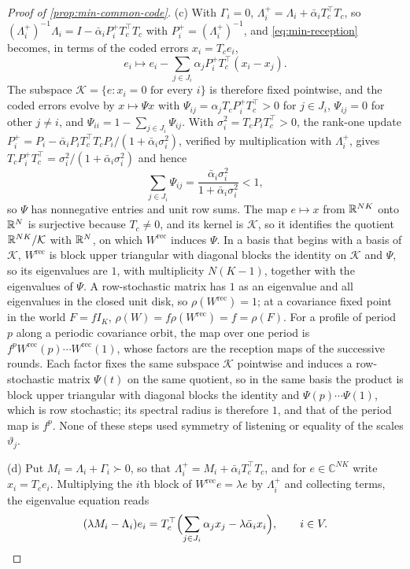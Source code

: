 \begin{proof}[Proof of \cref{prop:min-common-code}]
(c) With $\Gamma_i=0$, $\Lambda^+_i=\Lambda_i+\bar\alpha_iT_c^\top T_c$, so $(\Lambda^+_i)^{-1}\Lambda_i=I-\bar\alpha_iP^+_iT_c^\top T_c$ with $P^+_i=(\Lambda^+_i)^{-1}$, and \eqref{eq:min-reception} becomes, in terms of the coded errors $x_i=T_ce_i$,
\[
e_i\mapsto e_i-\sum_{j\in J_i}\alpha_jP^+_iT_c^\top(x_i-x_j).
\]
The subspace $\mathcal K=\{e:x_i=0\text{ for every }i\}$ is therefore fixed pointwise, and the coded errors evolve by $x\mapsto\Psi x$ with $\Psi_{ij}=\alpha_jT_cP^+_iT_c^\top>0$ for $j\in J_i$, $\Psi_{ij}=0$ for other $j\neq i$, and $\Psi_{ii}=1-\sum_{j\in J_i}\Psi_{ij}$. With $\sigma_i^2=T_cP_iT_c^\top>0$, the rank-one update $P^+_i=P_i-\bar\alpha_iP_iT_c^\top T_cP_i/(1+\bar\alpha_i\sigma_i^2)$, verified by multiplication with $\Lambda^+_i$, gives $T_cP^+_iT_c^\top=\sigma_i^2/(1+\bar\alpha_i\sigma_i^2)$ and hence
\[
\sum_{j\in J_i}\Psi_{ij}=\frac{\bar\alpha_i\sigma_i^2}{1+\bar\alpha_i\sigma_i^2}<1,
\]
so $\Psi$ has nonnegative entries and unit row sums. The map $e\mapsto x$ from $\mathbb{R}^{NK}$ onto $\mathbb{R}^N$ is surjective because $T_c\neq0$, and its kernel is $\mathcal K$, so it identifies the quotient $\mathbb{R}^{NK}/\mathcal K$ with $\mathbb{R}^N$, on which $W^{\mathrm{rec}}$ induces $\Psi$. In a basis that begins with a basis of $\mathcal K$, $W^{\mathrm{rec}}$ is block upper triangular with diagonal blocks the identity on $\mathcal K$ and $\Psi$, so its eigenvalues are $1$, with multiplicity $N(K-1)$, together with the eigenvalues of $\Psi$. A row-stochastic matrix has $1$ as an eigenvalue and all eigenvalues in the closed unit disk, so $\rho(W^{\mathrm{rec}})=1$; at a covariance fixed point in the world $F=fI_K$, $\rho(W)=f\rho(W^{\mathrm{rec}})=f=\rho(F)$. For a profile of period $p$ along a periodic covariance orbit, the map over one period is $f^pW^{\mathrm{rec}}(p)\cdots W^{\mathrm{rec}}(1)$, whose factors are the reception maps of the successive rounds. Each factor fixes the same subspace $\mathcal K$ pointwise and induces a row-stochastic matrix $\Psi(t)$ on the same quotient, so in the same basis the product is block upper triangular with diagonal blocks the identity and $\Psi(p)\cdots\Psi(1)$, which is row stochastic; its spectral radius is therefore $1$, and that of the period map is $f^p$. None of these steps used symmetry of listening or equality of the scales $\vartheta_j$.

(d) Put $M_i=\Lambda_i+\Gamma_i\succ0$, so that $\Lambda^+_i=M_i+\bar\alpha_iT_c^\top T_c$, and for $e\in\mathbb{C}^{NK}$ write $x_i=T_ce_i$. Multiplying the $i$th block of $W^{\mathrm{rec}}e=\lambda e$ by $\Lambda^+_i$ and collecting terms, the eigenvalue equation reads
\begin{equation}\label{eq:min-common-code-eig}
(\lambda M_i-\Lambda_i)e_i=T_c^\top\Bigl(\sum_{j\in J_i}\alpha_jx_j-\lambda\bar\alpha_ix_i\Bigr),\qquad i\in V.
\end{equation}


\end{proof}
